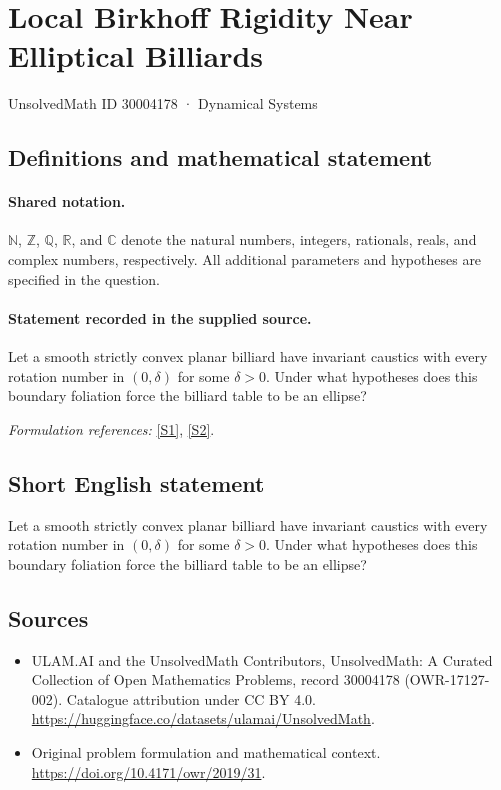 \documentclass[11pt]{article}
\newcommand{\sref}[2]{\hyperlink{source:#1:#2}{[S#2]}}
\begin{document}
\setcounter{section}{30004177}
\section{Local Birkhoff Rigidity Near Elliptical Billiards}\label{30004178}
{\small UnsolvedMath ID 30004178 · Dynamical Systems}
\subsection{Definitions and mathematical statement}

\paragraph{Shared notation.}$\mathbb N$, $\mathbb Z$, $\mathbb Q$, $\mathbb R$, and $\mathbb C$ denote the natural numbers, integers, rationals, reals, and complex numbers, respectively. All additional parameters and hypotheses are specified in the question.


\paragraph{Statement recorded in the supplied source.}
Let a smooth strictly convex planar billiard have invariant caustics with every rotation number in $(0,\delta)$ for some $\delta>0$. Under what hypotheses does this boundary foliation force the billiard table to be an ellipse?
\par\smallskip\textit{Formulation references:} \sref{30004178}{1}, \sref{30004178}{2}.
\subsection{Short English statement}
Let a smooth strictly convex planar billiard have invariant caustics with every rotation number in $(0,\delta)$ for some $\delta>0$. Under what hypotheses does this boundary foliation force the billiard table to be an ellipse?
\subsection{Sources}
\begin{itemize}
\item[\hypertarget{source:30004178:1}{S1}] ULAM.AI and the UnsolvedMath Contributors, UnsolvedMath: A Curated Collection of Open Mathematics Problems, record 30004178 (OWR-17127-002). Catalogue attribution under CC BY 4.0.
\url{https://huggingface.co/datasets/ulamai/UnsolvedMath}.
\item[\hypertarget{source:30004178:2}{S2}] Original problem formulation and mathematical context.
\url{https://doi.org/10.4171/owr/2019/31}.
\end{itemize}
\label{end:30004178}
\end{document}
